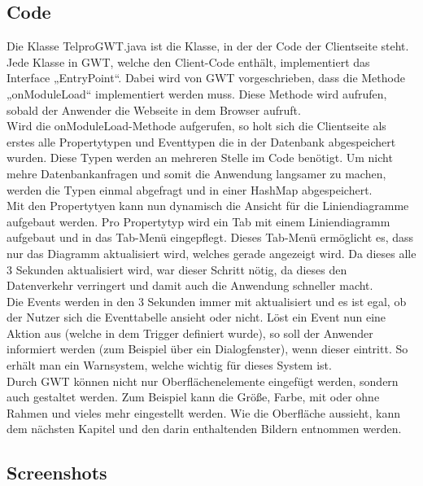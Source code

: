 \documentclass[12pt,a4paper,twoside]{article}
\begin{document}
\subsection{Code}
Die Klasse TelproGWT.java ist die Klasse, in der der Code der Clientseite steht. Jede Klasse in GWT, welche den Client-Code enthält, implementiert das Interface „EntryPoint“. Dabei wird von GWT vorgeschrieben, dass die Methode „onModuleLoad“ implementiert werden muss. Diese Methode wird aufrufen, sobald der Anwender die Webseite in dem Browser aufruft.\\
Wird die onModuleLoad-Methode aufgerufen, so holt sich die Clientseite als erstes alle Propertytypen und Eventtypen die in der Datenbank abgespeichert wurden. Diese Typen werden an mehreren Stelle im Code benötigt. Um nicht mehre Datenbankanfragen und somit die Anwendung langsamer zu machen, werden die Typen einmal abgefragt und in einer HashMap abgespeichert. \\
Mit den Propertytyen kann nun dynamisch die Ansicht für die Liniendiagramme aufgebaut werden. Pro Propertytyp wird ein Tab mit einem Liniendiagramm aufgebaut und in das Tab-Menü eingepflegt. Dieses Tab-Menü ermöglicht es, dass nur das Diagramm aktualisiert wird, welches gerade angezeigt wird. Da dieses alle 3 Sekunden aktualisiert wird, war dieser Schritt nötig, da dieses den Datenverkehr verringert und damit auch die Anwendung schneller macht.\\
Die Events werden in den 3 Sekunden immer mit aktualisiert und es ist egal, ob der Nutzer sich die Eventtabelle ansieht oder nicht. Löst ein Event nun eine Aktion aus (welche in dem Trigger definiert wurde), so soll der Anwender informiert werden (zum Beispiel über ein Dialogfenster), wenn dieser eintritt. So erhält man ein Warnsystem, welche wichtig für dieses System ist.\\
Durch GWT können nicht nur Oberflächenelemente eingefügt werden, sondern auch gestaltet werden. Zum Beispiel kann die Größe, Farbe, mit oder ohne Rahmen und vieles mehr eingestellt werden. Wie die Oberfläche aussieht, kann dem nächsten Kapitel und den darin enthaltenden Bildern entnommen werden.

\subsection{Screenshots}
\end{document}
